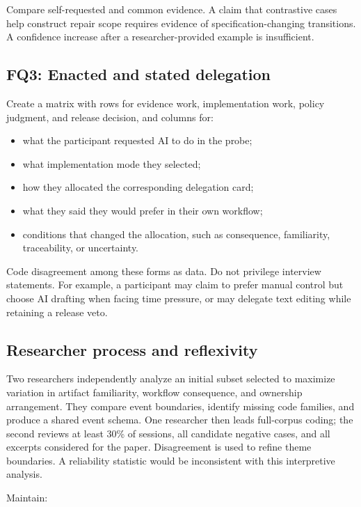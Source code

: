 Compare self-requested and common evidence. A claim that contrastive cases help
construct repair scope requires evidence of specification-changing transitions.
A confidence increase after a researcher-provided example is insufficient.

\subsection{FQ3: Enacted and stated delegation}

Create a matrix with rows for evidence work, implementation work, policy
judgment, and release decision, and columns for:

\begin{itemize}[leftmargin=*]
    \item what the participant requested AI to do in the probe;
    \item what implementation mode they selected;
    \item how they allocated the corresponding delegation card;
    \item what they said they would prefer in their own workflow;
    \item conditions that changed the allocation, such as consequence,
    familiarity, traceability, or uncertainty.
\end{itemize}

Code disagreement among these forms as data. Do not privilege interview
statements. For example, a participant may claim to prefer manual
control but choose AI drafting when facing time pressure, or may delegate text
editing while retaining a release veto.

\subsection{Researcher process and reflexivity}

Two researchers independently analyze an initial subset selected to maximize
variation in artifact familiarity, workflow consequence, and ownership
arrangement. They compare event boundaries, identify missing code families, and
produce a shared event schema. One researcher then leads full-corpus coding;
the second reviews at least 30\% of sessions, all candidate negative cases, and
all excerpts considered for the paper. Disagreement is used to refine theme
boundaries. A reliability statistic would be inconsistent with this
interpretive analysis.

Maintain:

